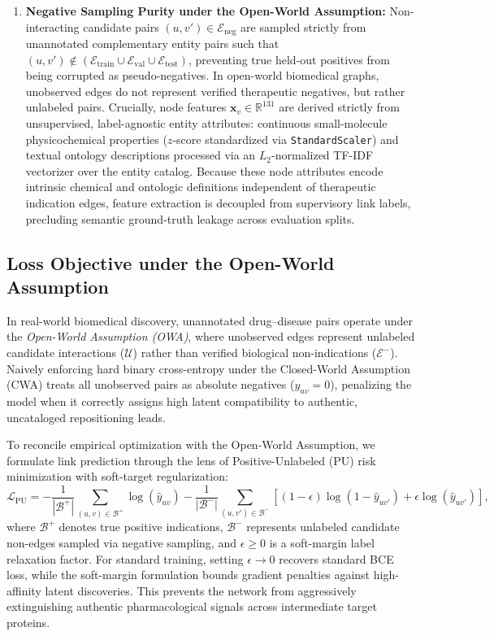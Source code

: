 \documentclass[preprint,12pt]{elsarticle}
\begin{document}
\begin{enumerate}
    \item \textbf{Negative Sampling Purity under the Open-World Assumption:} Non-interacting candidate pairs $(u, v') \in \mathcal{E}_{\mathrm{neg}}$ are sampled strictly from unannotated complementary entity pairs such that $(u, v') \notin (\mathcal{E}_{\mathrm{train}} \cup \mathcal{E}_{\mathrm{val}} \cup \mathcal{E}_{\mathrm{test}})$, preventing true held-out positives from being corrupted as pseudo-negatives. In open-world biomedical graphs, unobserved edges do not represent verified therapeutic negatives, but rather unlabeled pairs. Crucially, node features $\mathbf{x}_v \in \mathbb{R}^{131}$ are derived strictly from unsupervised, label-agnostic entity attributes: continuous small-molecule physicochemical properties ($z$-score standardized via \texttt{StandardScaler}) and textual ontology descriptions processed via an $L_2$-normalized TF-IDF vectorizer over the entity catalog. Because these node attributes encode intrinsic chemical and ontologic definitions independent of therapeutic indication edges, feature extraction is decoupled from supervisory link labels, precluding semantic ground-truth leakage across evaluation splits.
\end{enumerate}

\subsection{Loss Objective under the Open-World Assumption}
In real-world biomedical discovery, unannotated drug--disease pairs operate under the \textit{Open-World Assumption (OWA)}, where unobserved edges represent unlabeled candidate interactions ($\mathcal{U}$) rather than verified biological non-indications ($\mathcal{E}^-$). Naively enforcing hard binary cross-entropy under the Closed-World Assumption (CWA) treats all unobserved pairs as absolute negatives ($y_{uv} = 0$), penalizing the model when it correctly assigns high latent compatibility to authentic, uncataloged repositioning leads.

To reconcile empirical optimization with the Open-World Assumption, we formulate link prediction through the lens of Positive-Unlabeled (PU) risk minimization with soft-target regularization:
\begin{equation}
    \mathcal{L}_{\mathrm{PU}} = -\frac{1}{|\mathcal{B}^+|} \sum_{(u,v) \in \mathcal{B}^+} \log(\hat{y}_{uv}) - \frac{1}{|\mathcal{B}^-|} \sum_{(u,v') \in \mathcal{B}^-} \left[ (1 - \epsilon) \log(1 - \hat{y}_{uv'}) + \epsilon \log(\hat{y}_{uv'}) \right],
    \label{eq:pu_loss}
\end{equation}
where $\mathcal{B}^+$ denotes true positive indications, $\mathcal{B}^-$ represents unlabeled candidate non-edges sampled via negative sampling, and $\epsilon \ge 0$ is a soft-margin label relaxation factor. For standard training, setting $\epsilon \to 0$ recovers standard BCE loss, while the soft-margin formulation bounds gradient penalties against high-affinity latent discoveries. This prevents the network from aggressively extinguishing authentic pharmacological signals across intermediate target proteins.
\end{document}
